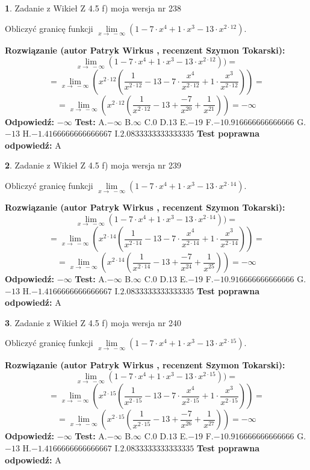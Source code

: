 \documentclass[12pt, a4paper]{article}
\theoremstyle{definition} %
\newtheorem{zad}{}
\newcommand{\zadStart}[1]{\begin{zad}#1\newline}
\newcommand{\zadStop}{\end{zad}}
\newcommand{\rozwStart}[2]{\noindent \textbf{Rozwiązanie (autor #1 , recenzent #2): }\newline}
\newcommand{\rozwStop}{\newline}
\newcommand{\odpStart}{\noindent \textbf{Odpowiedź:}\newline}
\newcommand{\odpStop}{\newline}
\newcommand{\testStart}{\noindent \textbf{Test:}\newline}
\newcommand{\testStop}{\newline}
\newcommand{\kluczStart}{\noindent \textbf{Test poprawna odpowiedź:}\newline}
\newcommand{\kluczStop}{\newline}
\begin{document}
\zadStart{Zadanie z Wikieł Z 4.5 f) moja wersja nr 238}


Obliczyć granicę funkcji  $\lim\limits_{x\to\ -\infty}(1 - 7 \cdot x^{4}+1 \cdot x^{3}- 13 \cdot x^{2\cdot12})$.
\zadStop
\rozwStart{Patryk Wirkus}{Szymon Tokarski}
$$\lim\limits_{x\to\ -\infty}(1 - 7 \cdot x^{4}+1 \cdot x^{3}- 13 \cdot x^{2\cdot12}))=$$
$$=\lim\limits_{x\to\ -\infty}(x^{2\cdot12}(\frac{1}{x^{2\cdot12}}-13 -7 \cdot \frac{x^{4}}{x^{2\cdot12}}+1 \cdot \frac{x^{3}}{x^{2\cdot12}}))=$$
$$=\lim\limits_{x\to\ -\infty}(x^{2\cdot12}(\frac{1}{x^{2\cdot12}}-13 + \frac{-7}{x^{20}}+ \frac{1}{x^{21}}))=-\infty$$
\rozwStop
\odpStart
$-\infty$
\odpStop
\testStart
A.$-\infty$ B.$\infty$ C.$0$ D.$13$ E.$-19$
F.$-10.916666666666666$ G.$-13$
H.$-1.4166666666666667$
I.$2.0833333333333335$
\testStop
\kluczStart
A
\kluczStop



\zadStart{Zadanie z Wikieł Z 4.5 f) moja wersja nr 239}


Obliczyć granicę funkcji  $\lim\limits_{x\to\ -\infty}(1 - 7 \cdot x^{4}+1 \cdot x^{3}- 13 \cdot x^{2\cdot14})$.
\zadStop
\rozwStart{Patryk Wirkus}{Szymon Tokarski}
$$\lim\limits_{x\to\ -\infty}(1 - 7 \cdot x^{4}+1 \cdot x^{3}- 13 \cdot x^{2\cdot14}))=$$
$$=\lim\limits_{x\to\ -\infty}(x^{2\cdot14}(\frac{1}{x^{2\cdot14}}-13 -7 \cdot \frac{x^{4}}{x^{2\cdot14}}+1 \cdot \frac{x^{3}}{x^{2\cdot14}}))=$$
$$=\lim\limits_{x\to\ -\infty}(x^{2\cdot14}(\frac{1}{x^{2\cdot14}}-13 + \frac{-7}{x^{24}}+ \frac{1}{x^{25}}))=-\infty$$
\rozwStop
\odpStart
$-\infty$
\odpStop
\testStart
A.$-\infty$ B.$\infty$ C.$0$ D.$13$ E.$-19$
F.$-10.916666666666666$ G.$-13$
H.$-1.4166666666666667$
I.$2.0833333333333335$
\testStop
\kluczStart
A
\kluczStop



\zadStart{Zadanie z Wikieł Z 4.5 f) moja wersja nr 240}


Obliczyć granicę funkcji  $\lim\limits_{x\to\ -\infty}(1 - 7 \cdot x^{4}+1 \cdot x^{3}- 13 \cdot x^{2\cdot15})$.
\zadStop
\rozwStart{Patryk Wirkus}{Szymon Tokarski}
$$\lim\limits_{x\to\ -\infty}(1 - 7 \cdot x^{4}+1 \cdot x^{3}- 13 \cdot x^{2\cdot15}))=$$
$$=\lim\limits_{x\to\ -\infty}(x^{2\cdot15}(\frac{1}{x^{2\cdot15}}-13 -7 \cdot \frac{x^{4}}{x^{2\cdot15}}+1 \cdot \frac{x^{3}}{x^{2\cdot15}}))=$$
$$=\lim\limits_{x\to\ -\infty}(x^{2\cdot15}(\frac{1}{x^{2\cdot15}}-13 + \frac{-7}{x^{26}}+ \frac{1}{x^{27}}))=-\infty$$
\rozwStop
\odpStart
$-\infty$
\odpStop
\testStart
A.$-\infty$ B.$\infty$ C.$0$ D.$13$ E.$-19$
F.$-10.916666666666666$ G.$-13$
H.$-1.4166666666666667$
I.$2.0833333333333335$
\testStop
\kluczStart
A
\kluczStop
\end{document}
